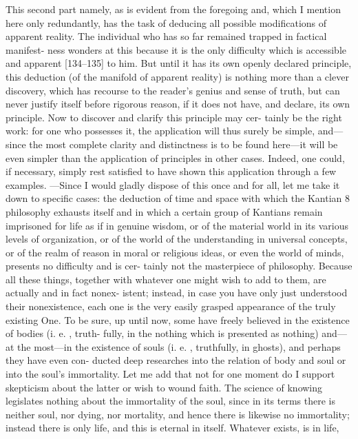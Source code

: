  This second part
namely, as is evident from the foregoing and, which I mention here only
redundantly, has the task of deducing all possible modifications of apparent
reality.
 The individual who has so far remained trapped in factical manifest-
ness wonders at this because it is the only difficulty which is accessible and
apparent [134–135] to him.
 But until it has its own openly declared principle,
this deduction (of the manifold of apparent reality) is nothing more than a
clever discovery, which has recourse to the reader’s genius and sense of truth,
but can never justify itself before rigorous reason, if it does not have, and
declare, its own principle.
 Now to discover and clarify this principle may cer-
tainly be the right work: for one who possesses it, the application will thus
surely be simple, and—since the most complete clarity and distinctness is to
be found here—it will be even simpler than the application of principles in
other cases.
 Indeed, one could, if necessary, simply rest satisfied to have shown
this application through a few examples.
—Since I would gladly dispose of this
once and for all, let me take it down to specific cases: the deduction of time
and space with which the Kantian 8 philosophy exhausts itself and in which a
certain group of Kantians remain imprisoned for life as if in genuine wisdom,
or of the material world in its various levels of organization, or of the world
of the understanding in universal concepts, or of the realm of reason in moral
or religious ideas, or even the world of minds, presents no difficulty and is cer-
tainly not the masterpiece of philosophy.
 Because all these things, together
with whatever one might wish to add to them, are actually and in fact nonex-
istent; instead, in case you have only just understood their nonexistence, each
one is the very easily grasped appearance of the truly existing One.
 To be sure,
up until now, some have freely believed in the existence of bodies (i.
e.
, truth-
fully, in the nothing which is presented as nothing) and—at the most—in the
existence of souls (i.
e.
, truthfully, in ghosts), and perhaps they have even con-
ducted deep researches into the relation of body and soul or into the soul’s
immortality.
 Let me add that not for one moment do I support skepticism
about the latter or wish to wound faith.
 The science of knowing legislates
nothing about the immortality of the soul, since in its terms there is neither
soul, nor dying, nor mortality, and hence there is likewise no immortality;
instead there is only life, and this is eternal in itself.
 Whatever exists, is in life,
